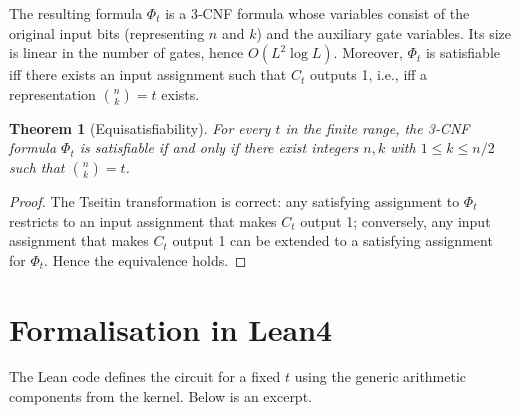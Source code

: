 \documentclass[11pt,a4paper]{article}
\newtheorem{theorem}{Theorem}[section]
\begin{document}
The resulting formula \(\Phi_t\) is a 3‑CNF formula whose variables consist of the original input bits (representing \(n\) and \(k\)) and the auxiliary gate variables. Its size is linear in the number of gates, hence \(O(L^2 \log L)\). Moreover, \(\Phi_t\) is satisfiable iff there exists an input assignment such that \(C_t\) outputs 1, i.e., iff a representation \(\binom{n}{k}=t\) exists.

\begin{theorem}[Equisatisfiability]
\label{thm:equiv}
For every \(t\) in the finite range, the 3‑CNF formula \(\Phi_t\) is satisfiable if and only if there exist integers \(n,k\) with \(1\le k\le n/2\) such that \(\binom{n}{k}=t\).
\end{theorem}
\begin{proof}
The Tseitin transformation is correct: any satisfying assignment to \(\Phi_t\) restricts to an input assignment that makes \(C_t\) output 1; conversely, any input assignment that makes \(C_t\) output 1 can be extended to a satisfying assignment for \(\Phi_t\). Hence the equivalence holds.
\end{proof}

\section{Formalisation in Lean4}

The Lean code defines the circuit for a fixed \(t\) using the generic arithmetic components from the kernel. Below is an excerpt.
\end{document}
